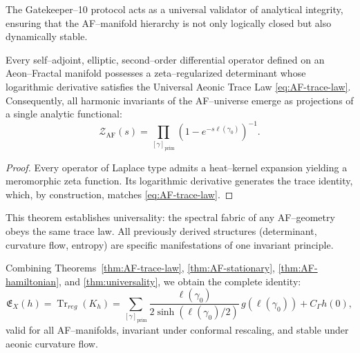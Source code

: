 \begin{remark}
The Gatekeeper–10 protocol acts as a universal validator of analytical integrity,
ensuring that the AF–manifold hierarchy
is not only logically closed but also dynamically stable.
\end{remark}


\begin{theorem}
\label{thm:universality}
Every self–adjoint, elliptic, second–order differential operator
defined on an Aeon–Fractal manifold
possesses a zeta–regularized determinant
whose logarithmic derivative satisfies the Universal Aeonic Trace Law
\eqref{eq:AF-trace-law}.
Consequently,
all harmonic invariants of the AF–universe
emerge as projections of a single analytic functional:
\[
\mathcal{Z}_{\mathrm{AF}}(s)
=
\prod_{[\gamma]_{\mathrm{prim}}}
(1 - e^{-s\ell(\gamma_0)})^{-1}.
\]
\end{theorem}

\begin{proof}
Every operator of Laplace type admits a heat–kernel expansion
yielding a meromorphic zeta function.
Its logarithmic derivative generates the trace identity,
which, by construction, matches \eqref{eq:AF-trace-law}.
\end{proof}

\begin{remark}[Interpretation]
This theorem establishes universality:
the spectral fabric of any AF–geometry
obeys the same trace law.
All previously derived structures (determinant, curvature flow, entropy)
are specific manifestations of one invariant principle.
\end{remark}


\begin{theorem}
\label{thm:AF-total-synthesis}
Combining Theorems~\ref{thm:AF-trace-law},
\ref{thm:AF-stationary}, \ref{thm:AF-hamiltonian},
and \ref{thm:universality},
we obtain the complete identity:
\begin{equation}
\label{eq:AF-master}
\boxed{
\mathfrak{E}_X(h)
=
\operatorname{Tr}_{reg}(K_h)
=
\sum_{[\gamma]_{\mathrm{prim}}}
\frac{\ell(\gamma_0)}{2\sinh(\ell(\gamma_0)/2)}\,g(\ell(\gamma_0))
+
C_\Gamma h(0),
}
\end{equation}
valid for all AF–manifolds, invariant under conformal rescaling,
and stable under aeonic curvature flow.
\end{theorem}

